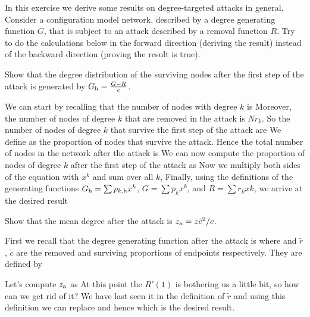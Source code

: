 
In this exercise we derive some results on degree-targeted attacks in general. Consider a configuration model network, described by a degree generating function $G$, that is subject to an attack described by a removal function $R$. Try to do the calculations below in the forward direction (deriving the result) instead of the backward direction (proving the result is true).

\subquestion Show that the degree distribution of the surviving nodes after the first step of the attack is generated by $G_{\rm h}=\frac{G-R}{c}$.

\solution
We can start by recalling that the number of nodes with degree $k$ is 
Moreover, the number of nodes of degree $k$ that are removed in the attack is $N r_k$. So the number of nodes of degree $k$ that survive the first step of the attack are
We define 
as the proportion of nodes that survive the attack. Hence the total number of nodes in the network after the attack is 
We can now compute the proportion of nodes of degree $k$ after the first step of the attack as 
Now we multiply both sides of the equation with $x^k$ and sum over all $k$,
Finally, using the definitions of the generating functions $G_{\rm h} = \sum p_{k,{\rm h}} x^k $, $G=\sum p_k x^k$, and $R=\sum r_k xk$, we arrive at the desired result

\subquestion Show that the mean degree after the attack is $z_{\rm a}=z\tilde{c}^2/c$.

\solution 
First we recall that the degree generating function after the attack is 
where 
and $\tilde{r}$, $\tilde{c}$ are the removed and surviving proportions of endpoints respectively. They are defined by  

Let's compute $z_{\rm a}$ as 
At this point the $R'(1)$ is bothering us a little bit, so how can we get rid of it? We have last seen it in the definition of $\tilde{r}$ and using this definition we can replace 
and hence 
which is the desired result. 

